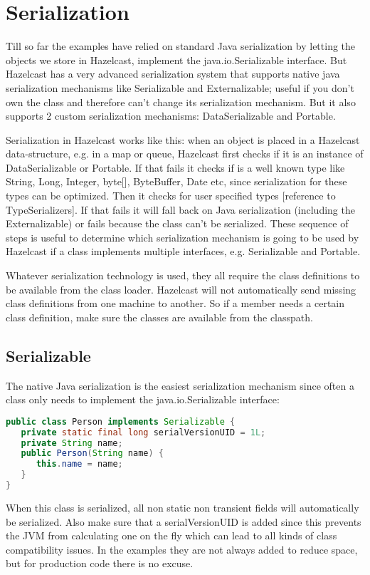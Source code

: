 \chapter{Serialization}
Till so far the examples have relied on standard Java serialization by letting the objects we store in Hazelcast, implement the java.io.Serializable interface. But Hazelcast has a very advanced serialization system that supports native java serialization mechanisms like Serializable and Externalizable; useful if you don't own the class and therefore can't change its serialization mechanism. But it also supports 2 custom serialization mechanisms: DataSerializable and Portable.

Serialization in Hazelcast works like this: when an object is placed in a Hazelcast data-structure, e.g. in a map or queue, Hazelcast first checks if it is an instance of DataSerializable or Portable. If that fails it checks if is a well known type like String, Long, Integer, byte[], ByteBuffer, Date etc, since serialization for these types can be optimized. Then it checks for user specified types [reference to TypeSerializers]. If that fails it will fall back on Java serialization (including the Externalizable) or fails because the class can't be serialized. These sequence of steps is useful to determine which serialization mechanism is going to be used by Hazelcast if a class implements multiple interfaces, e.g. Serializable and Portable.

Whatever serialization technology is used, they all require the class definitions to be available from the class loader. Hazelcast will not automatically send missing class definitions from one machine to another. So if a member needs a certain class definition, make sure the classes are available from the classpath. 

\section{Serializable}
The native Java serialization is the easiest serialization mechanism since often a class only needs to implement the java.io.Serializable interface:
\begin{lstlisting}[language=java]
public class Person implements Serializable {
   private static final long serialVersionUID = 1L;
   private String name;
   public Person(String name) {
      this.name = name; 
   }
}
\end{lstlisting}
When this class is serialized, all non static non transient fields will automatically be serialized. Also make sure that a serialVersionUID is added since this prevents the JVM from calculating one on the fly which can lead to all kinds of class compatibility issues. In the examples they are not always added to reduce space, but for production code there is no excuse.

